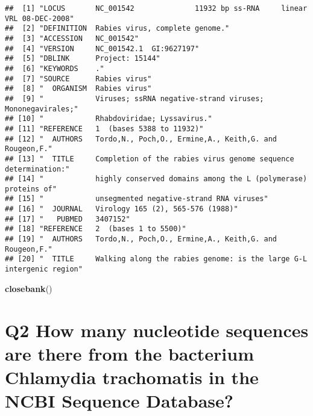 \documentclass[]{article}
\newenvironment{Shaded}{\begin{snugshade}}{\end{snugshade}}
\newcommand{\KeywordTok}[1]{\textcolor[rgb]{0.13,0.29,0.53}{\textbf{#1}}}
\newcommand{\NormalTok}[1]{#1}
\begin{document}
\begin{verbatim}
##  [1] "LOCUS       NC_001542              11932 bp ss-RNA     linear   VRL 08-DEC-2008"
##  [2] "DEFINITION  Rabies virus, complete genome."                                     
##  [3] "ACCESSION   NC_001542"                                                          
##  [4] "VERSION     NC_001542.1  GI:9627197"                                            
##  [5] "DBLINK      Project: 15144"                                                     
##  [6] "KEYWORDS    ."                                                                  
##  [7] "SOURCE      Rabies virus"                                                       
##  [8] "  ORGANISM  Rabies virus"                                                       
##  [9] "            Viruses; ssRNA negative-strand viruses; Mononegavirales;"           
## [10] "            Rhabdoviridae; Lyssavirus."                                         
## [11] "REFERENCE   1  (bases 5388 to 11932)"                                           
## [12] "  AUTHORS   Tordo,N., Poch,O., Ermine,A., Keith,G. and Rougeon,F."              
## [13] "  TITLE     Completion of the rabies virus genome sequence determination:"      
## [14] "            highly conserved domains among the L (polymerase) proteins of"      
## [15] "            unsegmented negative-strand RNA viruses"                            
## [16] "  JOURNAL   Virology 165 (2), 565-576 (1988)"                                   
## [17] "   PUBMED   3407152"                                                            
## [18] "REFERENCE   2  (bases 1 to 5500)"                                               
## [19] "  AUTHORS   Tordo,N., Poch,O., Ermine,A., Keith,G. and Rougeon,F."              
## [20] "  TITLE     Walking along the rabies genome: is the large G-L intergenic region"
\end{verbatim}

\begin{Shaded}
\begin{Highlighting}[]
\KeywordTok{closebank}\NormalTok{()}
\end{Highlighting}
\end{Shaded}

\section{Q2 How many nucleotide sequences are there from the bacterium
Chlamydia trachomatis in the NCBI Sequence
Database?}\label{q2-how-many-nucleotide-sequences-are-there-from-the-bacterium-chlamydia-trachomatis-in-the-ncbi-sequence-database}
\end{document}
